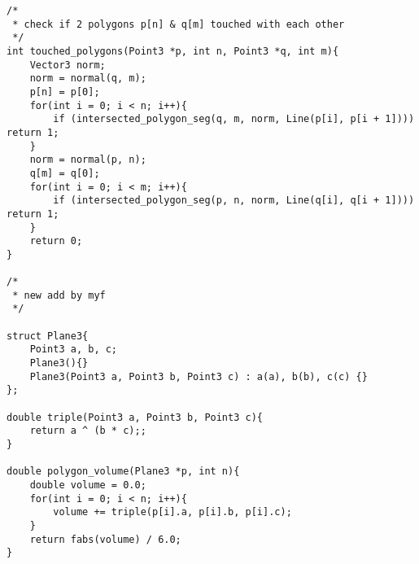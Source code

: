 \begin{verbatim}
/*
 * check if 2 polygons p[n] & q[m] touched with each other
 */
int touched_polygons(Point3 *p, int n, Point3 *q, int m){
    Vector3 norm;
    norm = normal(q, m);
    p[n] = p[0];
    for(int i = 0; i < n; i++){
        if (intersected_polygon_seg(q, m, norm, Line(p[i], p[i + 1]))) return 1;
    }
    norm = normal(p, n);
    q[m] = q[0];
    for(int i = 0; i < m; i++){
        if (intersected_polygon_seg(p, n, norm, Line(q[i], q[i + 1]))) return 1;
    }
    return 0;
}

/*
 * new add by myf
 */

struct Plane3{
    Point3 a, b, c;
    Plane3(){}
    Plane3(Point3 a, Point3 b, Point3 c) : a(a), b(b), c(c) {}
};

double triple(Point3 a, Point3 b, Point3 c){
    return a ^ (b * c);;
}

double polygon_volume(Plane3 *p, int n){
    double volume = 0.0;
    for(int i = 0; i < n; i++){
        volume += triple(p[i].a, p[i].b, p[i].c);
    }
    return fabs(volume) / 6.0;
}
\end{verbatim}

